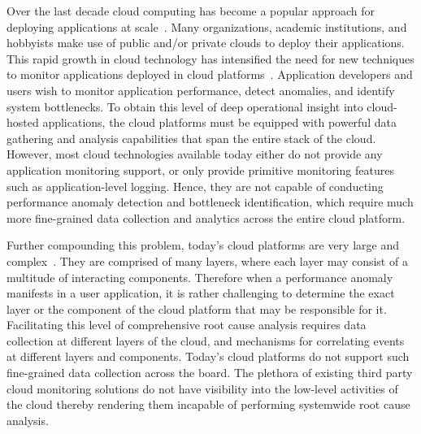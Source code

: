 Over the last decade cloud computing has become a popular approach for deploying
applications at scale~\cite{Antonopoulos:2010:CCP:1855007,Pinheiro:2014:ACC:2618168.2618188}. 
Many organizations, academic institutions, and hobbyists make use of public
and/or private clouds to deploy their applications.
This rapid growth in cloud technology has intensified the need 
for new techniques to
monitor applications deployed in cloud platforms~\cite{DaCunhaRodrigues:2016:MCC:2851613.2851619}. 
Application developers and users wish to monitor application performance, detect 
anomalies, and identify system bottlenecks. To obtain this level of deep operational insight into
cloud-hosted applications, the cloud platforms must be equipped with powerful
data gathering and analysis capabilities that span the entire stack of the cloud. 
However, most cloud technologies available
today either do not provide any application monitoring support, or only provide primitive
monitoring features such as application-level logging. Hence, they are not capable of conducting
performance anomaly detection and bottleneck identification, which require much more fine-grained
data collection and analytics across the entire cloud platform.

Further compounding this problem, today's cloud platforms are very 
large and complex~\cite{DaCunhaRodrigues:2016:MCC:2851613.2851619,Ibidunmoye:2015:PAD:2808687.2791120}. They are
comprised of many layers, where each layer may consist of a multitude of interacting components.
Therefore when a performance anomaly manifests in a user application, it is rather challenging 
to determine the exact layer or the component of the cloud platform that may be responsible for it. 
Facilitating this level of comprehensive root cause analysis requires
data collection at different layers of the cloud, and mechanisms for correlating events at
different layers and components. Today's cloud platforms do not support such fine-grained
data collection across the board. The plethora of existing third party cloud monitoring solutions
do not have visibility into the low-level activities of the cloud thereby rendering them incapable
of performing systemwide root cause analysis.

